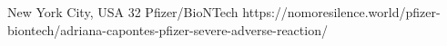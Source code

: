           {New York City, USA}
          {32}
          {Pfizer/BioNTech}
          {}
          {
          }
          {https://nomoresilence.world/pfizer-biontech/adriana-capontes-pfizer-severe-adverse-reaction/}

